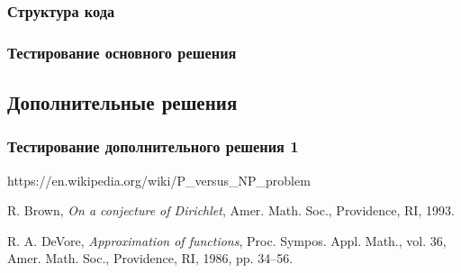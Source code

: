 \documentclass{amsart}
\theoremstyle{definition}
\theoremstyle{remark}
\numberwithin{equation}{section}
\begin{document}

\subsubsection{Структура кода}

\subsubsection{Тестирование основного решения}

\subsection{Дополнительные решения}

\subsubsection{Тестирование дополнительного решения 1}







\begin{thebibliography}{10}

\bibitem  https://en.wikipedia.org/wiki/P\_versus\_NP\_problem

 R. Brown, \textit{On a conjecture of Dirichlet},
Amer. Math. Soc., Providence, RI, 1993.

 R. A. DeVore, \textit{Approximation of functions},
Proc. Sympos. Appl. Math., vol. 36,
Amer. Math. Soc., Providence, RI, 1986, pp. 34--56.

\end{thebibliography}
\end{document}
